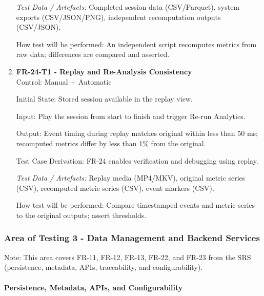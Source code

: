 \documentclass[12pt, titlepage]{article}
\begin{document}
\begin{enumerate}
\textit{Test Data / Artefacts:} Completed session data (CSV/Parquet), system exports (CSV/JSON/PNG), independent recomputation outputs (CSV/JSON).

How test will be performed: An independent script recomputes metrics from raw data; differences are compared and asserted.

\item \textbf{FR-24-T1 - Replay and Re-Analysis Consistency} \\

Control: Manual + Automatic

Initial State: Stored session available in the replay view.

Input: Play the session from start to finish and trigger Re-run Analytics.

Output: Event timing during replay matches original within less than 50 ms; recomputed metrics differ by less than 1\% from the original.

Test Case Derivation: FR-24 enables verification and debugging using replay.

\textit{Test Data / Artefacts:} Replay media (MP4/MKV), original metric series (CSV), recomputed metric series (CSV), event markers (CSV).

How test will be performed: Compare timestamped events and metric series to the original outputs; assert thresholds.

\end{enumerate}


\subsubsection{Area of Testing 3 - Data Management and Backend Services}

Note: This area covers FR-11, FR-12, FR-13, FR-22, and FR-23 from the SRS (persistence, metadata, APIs, traceability, and configurability).

\paragraph{Persistence, Metadata, APIs, and Configurability}
\end{document}
